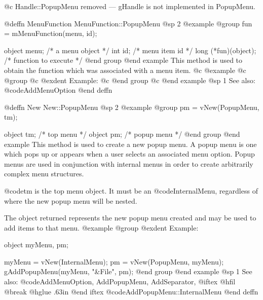 @c Handle::PopupMenu removed — gHandle is not implemented in PopupMenu.








@deffn {MenuFunction} MenuFunction::PopupMenu
@sp 2
@example
@group
fun = mMenuFunction(menu, id);

object  menu;   /*  a menu object     */
int     id;     /*  menu item id      */
long    (*fun)(object);  /*  function to execute  */
@end group
@end example
This method is used to obtain the function which was associated with a
menu item.
@c @example
@c @group
@c @exdent Example:
@c @end group
@c @end example
@sp 1
See also:  @code{AddMenuOption}
@end deffn








@deffn {New} New::PopupMenu
@sp 2
@example
@group
pm = vNew(PopupMenu, tm);

object  tm;     /*  top menu    */
object  pm;     /*  popup menu  */
@end group
@end example
This method is used to create a new popup menu.  A popup menu is one
which pops up or appears when a user selects an associated menu option.
Popup menus are used in conjunction with internal menus in order to
create arbitrarily complex menu structures.

@code{tm} is the top menu object.  It must be an @code{InternalMenu},
regardless of where the new popup menu will be nested.

The object returned represents the new popup menu created and may be
used to add items to that menu.
@example
@group
@exdent Example:

object  myMenu, pm;

myMenu = vNew(InternalMenu);
pm = vNew(PopupMenu, myMenu);
gAddPopupMenu(myMenu, "&File", pm);
@end group
@end example
@sp 1
See also:  @code{AddMenuOption, AddPopupMenu, AddSeparator,}
@iftex
@hfil @break @hglue .63in     
@end iftex
@code{AddPopupMenu::InternalMenu}
@end deffn







